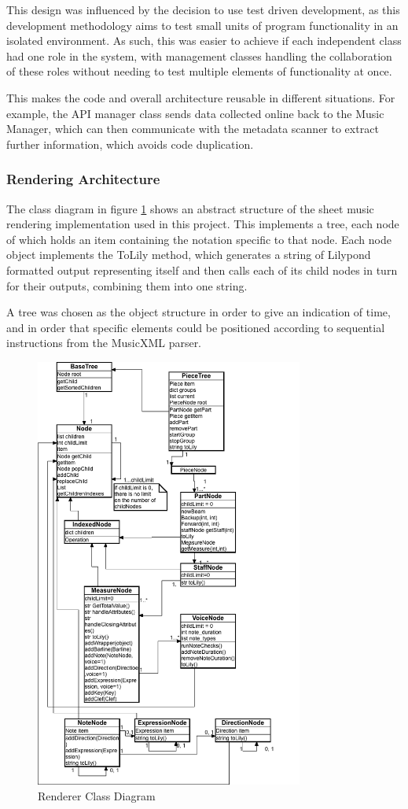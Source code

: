 This design was influenced by the decision to use test driven development, as this development methodology aims to test small units of program functionality in an isolated environment. %
 As such, this was easier to achieve if each independent class had one role in the system, with management classes handling the collaboration of these roles without needing to test multiple elements of functionality at once. 

This makes the code and overall architecture reusable in different situations. For example, the API manager class sends data collected online back to the Music Manager, which can then communicate with the metadata scanner to extract further information, which avoids code duplication.

\subsubsection{Rendering Architecture}
The class diagram in figure \ref{fig:classdiagram} shows an abstract structure of the sheet music rendering implementation used in this project. This implements a tree, each node of which holds an item containing the notation specific to that node. Each node object implements the ToLily method, which generates a string of Lilypond formatted output representing itself and then calls each of its child nodes in turn for their outputs, combining them into one string. 

A tree was chosen as the object structure in order to give an indication of time, and in order that specific elements could be positioned according to sequential instructions from the MusicXML parser. 
\begin{figure}[H]
    \centering
    \includegraphics[width=250pt]{diagrams/render-tree.png}
    \caption{Renderer Class Diagram}
    \label{fig:classdiagram}
\end{figure}
